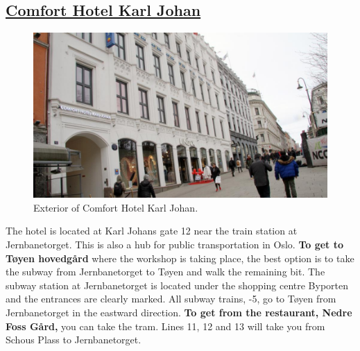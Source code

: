 \documentclass{article}
\begin{document}
\clearpage

\subsection*{\underline{Comfort Hotel Karl Johan}}

\begin{figure}
\centering
\includegraphics[scale=0.2]{img/comfort_karl_johan.jpg}
\caption{\label{fig:frog1}Exterior of Comfort Hotel Karl Johan.}
\end{figure}
The hotel is located at Karl Johans gate 12 near
the train station at Jernbanetorget.
This is also
a hub for public transportation in Oslo. \textbf{To get to
Tøyen hovedgård} where the workshop is taking place,
the best option is to take the subway from Jernbanetorget
to Tøyen and walk the remaining bit. The subway station
at Jernbanetorget is located under the shopping centre
Byporten and the entrances are clearly marked.
All subway trains,
-5, go to Tøyen from
Jernbanetorget in the eastward direction. \textbf{To get from
the restaurant, Nedre Foss Gård,} you can take the tram. Lines
11, 12 and 13 will take you from Schous Plass to Jernbanetorget.
\end{document}
